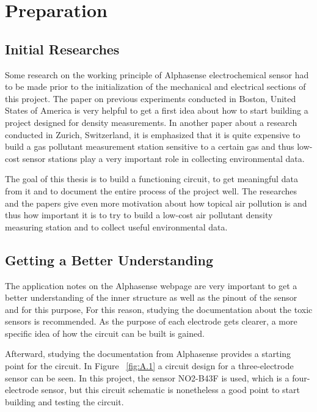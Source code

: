 \chapter{Preparation}
\label{sec:firststeps}

\section{Initial Researches}
Some research on the working principle of Alphasense  electrochemical sensor had to be made prior to the initialization of the mechanical and electrical sections of this project. The paper \cite{Hutton2011} on previous experiments conducted in Boston, United States of America is very helpful to get a first idea about how to start building a project designed for  density measurements. In another paper about a research conducted in Zurich, Switzerland, \cite{Mueller2017} it is emphasized that it is quite expensive to build a gas pollutant measurement station sensitive to a certain gas and thus low-cost sensor stations play a very important role in collecting environmental data. \par 
The goal of this thesis is to build a functioning circuit, to get meaningful data from it and to document the entire process of the project well. The researches and the papers give even more motivation about how topical air pollution is and thus how important it is to try to build a low-cost air pollutant density measuring station and to collect useful environmental data.

\section{Getting a Better Understanding}
The application notes on the Alphasense webpage are very important to get a better understanding of the inner structure as well as the pinout of the sensor and for this purpose, For this reason, studying the documentation about the toxic sensors \cite{HowElectrochemicalGasSensorsWork} is recommended. As the purpose of each electrode gets clearer, a more specific idea of how the circuit can be built is gained.\par
Afterward, studying the documentation from Alphasense \cite{2009} provides a starting point for the circuit. In Figure ~\ref{fig:A.1} a circuit design for a three-electrode sensor can be seen. In this project, the sensor NO2-B43F is used, which is a four-electrode sensor, but this circuit schematic is nonetheless a good point to start building and testing the circuit.


